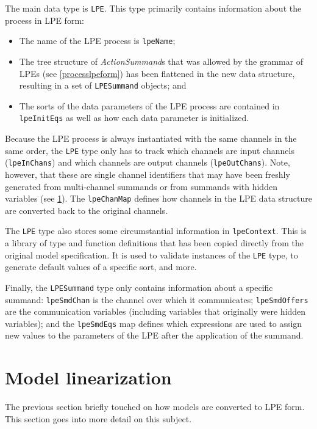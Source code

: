 The main data type is \texttt{LPE}.
This type primarily contains information about the \txs{} process in LPE form:
\begin{itemize}
\item The name of the LPE process is \texttt{lpeName};
\item The tree structure of \textit{ActionSummand}s that was allowed by the grammar of LPEs (see \ref{processlpeform}) has been flattened in the new data structure, resulting in a set of \texttt{LPESummand} objects; and
\item The sorts of the data parameters of the LPE process are contained in \texttt{lpeInitEqs} as well as how each data parameter is initialized.
\end{itemize}

Because the LPE process is always instantiated with the same channels in the same order, the \texttt{LPE} type only has to track which channels are input channels (\texttt{lpeInChans}) and which channels are output channels (\texttt{lpeOutChans}).
Note, however, that these are single channel identifiers that may have been freshly generated from multi-channel summands or from summands with hidden variables (see \ref{modellinearization}).
The \texttt{lpeChanMap} defines how channels in the LPE data structure are converted back to the original channels.

The \texttt{LPE} type also stores some circumstantial information in \texttt{lpeContext}.
This is a library of \txs{} type and function definitions that has been copied directly from the original \txs{} model specification.
It is used to validate instances of the \texttt{LPE} type, to generate default values of a specific sort, and more.

Finally, the \texttt{LPESummand} type only contains information about a specific summand: \texttt{lpeSmdChan} is the channel over which it communicates; \texttt{lpeSmdOffers} are the communication variables (including variables that originally were hidden variables); and the \texttt{lpeSmdEqs} map defines which expressions are used to assign new values to the parameters of the LPE after the application of the summand.

\section{Model linearization} \label{modellinearization}

The previous section briefly touched on how models are converted to LPE form.
This section goes into more detail on this subject.

